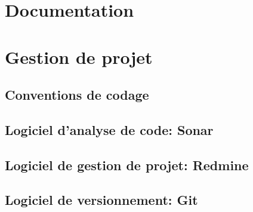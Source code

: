 \documentclass[12pt,a4paper,openany]{article}
\begin{document}
	\section{Documentation}
	\section{Gestion de projet}
	\subsection{Conventions de codage}
	\subsection{Logiciel d'analyse de code: Sonar}
	\subsection{Logiciel de gestion de projet: Redmine}
	\subsection{Logiciel de versionnement: Git}
\end{document}
